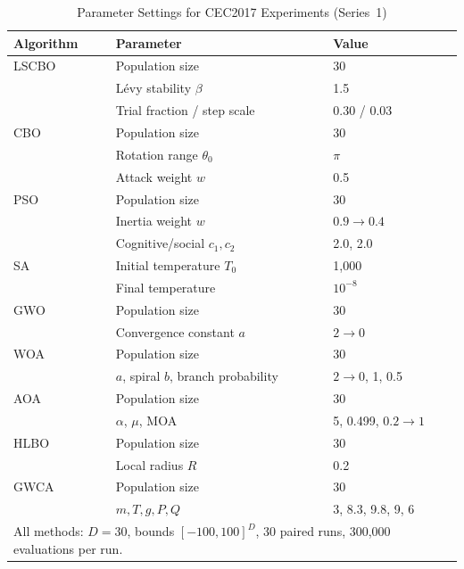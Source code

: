 \documentclass[pdflatex,onecolumn,sn-mathphys-num]{sn-jnl}
\begin{document}
\begin{table}[ht]
\centering
\caption{Parameter Settings for CEC2017 Experiments (Series~1)}\label{tab:param_cec}
\begin{tabular}{l l l}
\toprule
\textbf{Algorithm} & \textbf{Parameter} & \textbf{Value} \\
\midrule
LSCBO & Population size & 30 \\
       & L\'{e}vy stability $\beta$ & 1.5 \\
       & Trial fraction / step scale & 0.30 / 0.03 \\
\midrule
CBO & Population size & 30 \\
    & Rotation range $\theta_0$ & $\pi$ \\
    & Attack weight $w$ & 0.5 \\
\midrule
PSO & Population size & 30 \\
    & Inertia weight $w$ & $0.9 \rightarrow 0.4$ \\
    & Cognitive/social $c_1, c_2$ & 2.0, 2.0 \\
\midrule
SA & Initial temperature $T_0$ & 1,000 \\
   & Final temperature & $10^{-8}$ \\
\midrule
GWO & Population size & 30 \\
    & Convergence constant $a$ & $2 \rightarrow 0$ \\
\midrule
WOA & Population size & 30 \\
    & $a$, spiral $b$, branch probability & $2\!\rightarrow\!0$, 1, 0.5 \\
\midrule
AOA & Population size & 30 \\
    & $\alpha$, $\mu$, MOA & 5, 0.499, $0.2\!\rightarrow\!1$ \\
\midrule
HLBO & Population size & 30 \\
     & Local radius $R$ & 0.2 \\
\midrule
GWCA & Population size & 30 \\
     & $m,T,g,P,Q$ & 3, 8.3, 9.8, 9, 6 \\
\midrule
\multicolumn{3}{l}{\footnotesize{All methods: $D=30$, bounds $[-100,100]^D$, 30 paired runs, 300,000 evaluations per run.}} \\
\bottomrule
\end{tabular}
\end{table}
\end{document}
